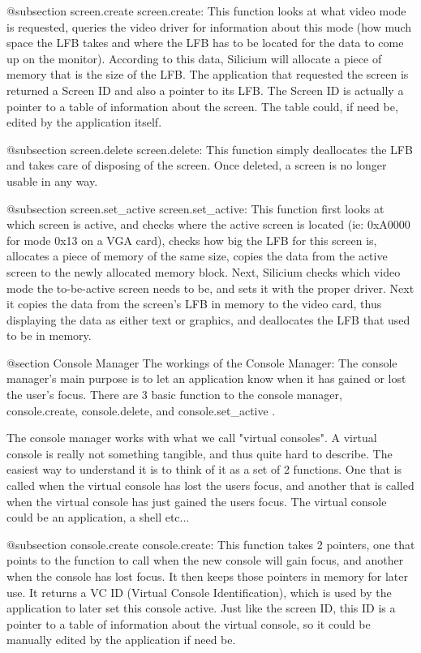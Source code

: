 @subsection screen.create
screen.create:
This function looks at what video mode is requested, queries the video driver for information about this mode (how much space the LFB takes and where the LFB has to be located for the data to come up on the monitor).  According to this data, Silicium will allocate a piece of memory that is the size of the LFB.  The application that requested the screen is returned a Screen ID and also a pointer to its LFB.  The Screen ID is actually a pointer to a table of information about the screen.  The table could, if need be, edited by the application itself.

@subsection screen.delete
screen.delete:
This function simply deallocates the LFB and takes care of disposing of the screen.  Once deleted, a screen is no longer usable in any way.

@subsection screen.set_active
screen.set_active:
This function first looks at which screen is active, and checks where the active screen is located (ie: 0xA0000 for mode 0x13 on a VGA card), checks how big the LFB for this screen is, allocates a piece of memory of the same size, copies the data from the active screen to the newly allocated memory block.  Next, Silicium checks which video mode the to-be-active screen needs to be, and sets it with the proper driver.  Next it copies the data from the screen's LFB in memory to
the video card, thus displaying the data as either text or graphics, and deallocates the LFB that used to be in memory.

@section Console Manager
The workings of the Console Manager:
The console manager's main purpose is to let an application know when it has gained or lost the user's focus.  There are 3 basic function to the console manager, console.create, console.delete, and console.set_active .

The console manager works with what we call "virtual consoles".  A virtual console is really not something tangible, and thus quite hard to describe.  The easiest way to understand it is to think of it as a set of 2 functions.  One that is
called when the virtual console has lost the users focus, and another that is called when the virtual console has just gained the users focus.  The virtual console could be an application, a shell etc...

@subsection console.create
console.create:
This function takes 2 pointers, one that points to the function to call when the new console will gain focus, and another when the console has lost focus.  It then keeps those pointers in memory for later use.  It returns a VC ID (Virtual Console Identification), which is used by the application to later set this console active.  Just like the screen ID, this ID is a pointer to a table of information about the virtual console, so it could be manually edited by the application if need be.

